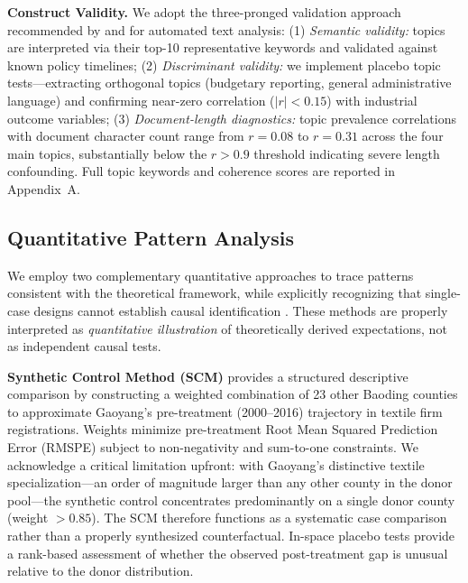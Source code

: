 \documentclass[sustainability,article,submit,moreauthors,pdftex]{mdpi}
\begin{document}
\textbf{Construct Validity.} We adopt the three-pronged validation approach recommended by \citet{Grimmer2013} and \citet{Gentzkow2019} for automated text analysis: (1) \emph{Semantic validity:} topics are interpreted via their top-10 representative keywords and validated against known policy timelines; (2) \emph{Discriminant validity:} we implement placebo topic tests---extracting orthogonal topics (budgetary reporting, general administrative language) and confirming near-zero correlation ($|r| < 0.15$) with industrial outcome variables; (3) \emph{Document-length diagnostics:} topic prevalence correlations with document character count range from $r=0.08$ to $r=0.31$ across the four main topics, substantially below the $r>0.9$ threshold indicating severe length confounding. Full topic keywords and coherence scores are reported in Appendix~A.

\subsection{Quantitative Pattern Analysis}
We employ two complementary quantitative approaches to trace patterns consistent with the theoretical framework, while explicitly recognizing that single-case designs cannot establish causal identification \citep{Cai2016}. These methods are properly interpreted as \emph{quantitative illustration} of theoretically derived expectations, not as independent causal tests.

\textbf{Synthetic Control Method (SCM)} \citep{Abadie2010} provides a structured descriptive comparison by constructing a weighted combination of 23 other Baoding counties to approximate Gaoyang's pre-treatment (2000--2016) trajectory in textile firm registrations. Weights minimize pre-treatment Root Mean Squared Prediction Error (RMSPE) subject to non-negativity and sum-to-one constraints. We acknowledge a critical limitation upfront: with Gaoyang's distinctive textile specialization---an order of magnitude larger than any other county in the donor pool---the synthetic control concentrates predominantly on a single donor county (weight $>0.85$). The SCM therefore functions as a systematic case comparison rather than a properly synthesized counterfactual. In-space placebo tests \citep{Ludbrook1998} provide a rank-based assessment of whether the observed post-treatment gap is unusual relative to the donor distribution.
\end{document}
